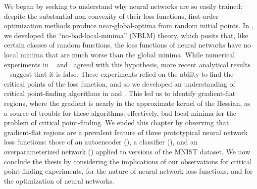 \documentclass[../../thesis.tex]{subfiles}
\begin{document}
We began by seeking to understand why neural networks are so easily trained:
despite the substantial non-convexity of their loss functions,
first-order optimization methods produce near-global-optima
from random initial points.
In ,
we developed the \enquote{no-bad-local-minima} (NBLM) theory,
which posits that, like certain classes of random functions,
the loss functions of neural networks have no local minima
that are much worse than the global minima.
While numerical experiments in%
~\cite{dauphin2014} and~\cite{pennington2017}
agreed with this hypothesis,
more recent analytical results%
~\cite{ding2019} suggest that it is false.
These experiments relied on the ability to find
the critical points of the loss function,
and so we developed
an understanding of critical point-finding algorithms
in  and .
This led us to identify gradient-flat regions,
where the gradient is nearly in the approximate kernel of the Hessian,
as a source of trouble for these algorithms:
effectively, bad local minima for the problem of critical point-finding.
We ended this chapter by observing that gradient-flat regions are a prevalent
feature of three prototypical neural network loss functions:
those of an autoencoder (),
a classifier (),
and an overparameterized network ()
applied to versions of the MNIST dataset.
We now conclude the thesis by considering the implications
of our observations for critical point-finding experiments,
for the nature of neural network loss functions,
and for the optimization of neural networks.
\end{document}
